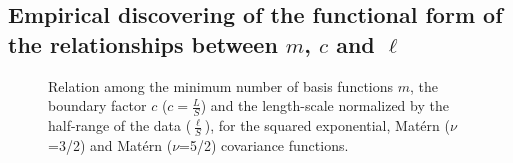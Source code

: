 \subsection{Empirical discovering of the functional form of the relationships between $m$, $c$ and $\ell$} \label{subsec_empiric_relations}

\begin{figure}
\centering
{}
\caption{Relation among the minimum number of basis functions $m$, the boundary factor $c$ \hspace{0.1mm} ($c = \frac{L}{S}$) \hspace{0.1mm} and the length-scale normalized by the half-range of the data ($\frac{\ell}{S}$), for the squared exponential, Mat\'ern ($\nu$=3/2) and Mat\'ern ($\nu$=5/2) covariance functions.}
  \label{fig5_relationships}
\end{figure}

